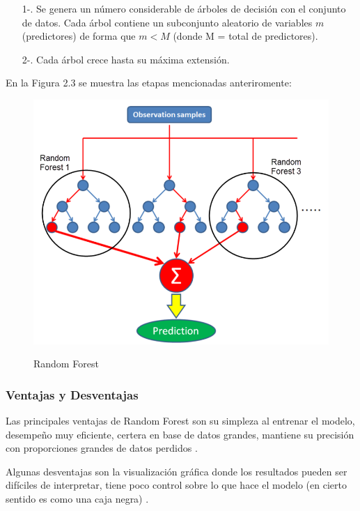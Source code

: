 \begin{itemize}
	\item[1-.] Se genera un número considerable de árboles de decisión con el conjunto de datos. Cada árbol contiene un subconjunto aleatorio de variables $m$ (predictores) de forma que $m < M$ (donde M = total de predictores).
	\item[2-.] Cada árbol crece hasta su máxima extensión.
\end{itemize}

\par En la Figura 2.3 se muestra las etapas mencionadas anteriromente:

\begin{center}
	\begin{figure}[H]
		\centering
		\includegraphics[scale=0.5]{img/Marco Teorico/random-forest-1.png} 
		\label{fig:Random Forest}
		\caption{Random Forest}
	\end{figure}
\end{center}


\doublespacing
\subsubsection{Ventajas y Desventajas}

Las principales ventajas de Random Forest son su simpleza al entrenar el modelo, desempeño muy eficiente, certera en base de datos grandes, mantiene su precisión con proporciones grandes de datos perdidos \cite{canovas2017modification}.\\
\par Algunas desventajas son la visualización gráfica donde los resultados pueden ser difíciles de interpretar, tiene poco control sobre lo que hace el modelo (en cierto sentido es como una caja negra) \cite{canovas2017modification}.\\

